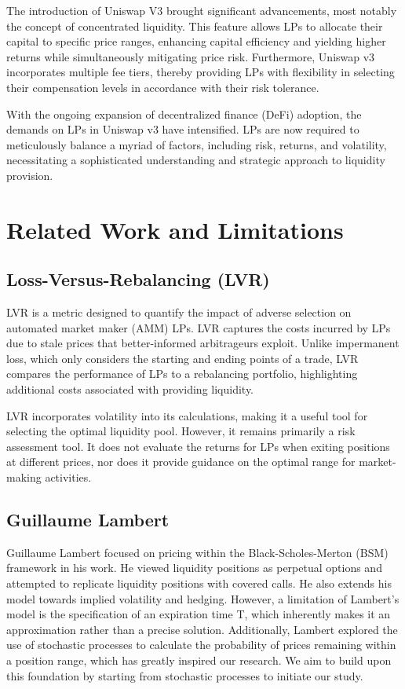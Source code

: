 \documentclass[conference]{IEEEtran}
\begin{document}
The introduction of Uniswap V3 brought significant advancements, most notably the concept of concentrated liquidity. This feature allows LPs to allocate their capital to specific price ranges, enhancing capital efficiency and yielding higher returns while simultaneously mitigating price risk. Furthermore, Uniswap v3 incorporates multiple fee tiers, thereby providing LPs with flexibility in selecting their compensation levels in accordance with their risk tolerance.

With the ongoing expansion of decentralized finance (DeFi) adoption, the demands on LPs in Uniswap v3 have intensified. LPs are now required to meticulously balance a myriad of factors, including risk, returns, and volatility, necessitating a sophisticated understanding and strategic approach to liquidity provision.


\section{Related Work and Limitations}

\subsection{Loss-Versus-Rebalancing (LVR)}

LVR is a metric designed to quantify the impact of adverse selection on automated market maker (AMM) LPs\cite{b2}. LVR captures the costs incurred by LPs due to stale prices that better-informed arbitrageurs exploit. Unlike impermanent loss, which only considers the starting and ending points of a trade, LVR compares the performance of LPs to a rebalancing portfolio, highlighting additional costs associated with providing liquidity.

LVR incorporates volatility into its calculations, making it a useful tool for selecting the optimal liquidity pool. However, it remains primarily a risk assessment tool. It does not evaluate the returns for LPs when exiting positions at different prices, nor does it provide guidance on the optimal range for market-making activities.

\subsection{Guillaume Lambert}
Guillaume Lambert focused on pricing within the Black-Scholes-Merton (BSM) framework in his work\cite{b3}\cite{b4}. He viewed liquidity positions as perpetual options and attempted to replicate liquidity positions with covered calls. He also extends his model towards implied volatility and hedging. However, a limitation of Lambert's model is the specification of an expiration time T, which inherently makes it an approximation rather than a precise solution. Additionally, Lambert explored the use of stochastic processes to calculate the probability of prices remaining within a position range, which has greatly inspired our research. We aim to build upon this foundation by starting from stochastic processes to initiate our study.
\end{document}
